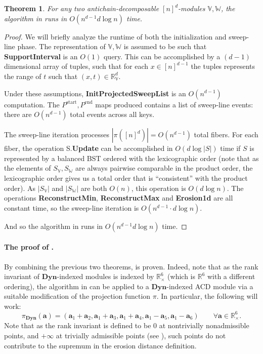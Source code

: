 \documentclass[a4paper,UKenglish,thm-restate]{article}
\newtheorem{theorem}{Theorem}[section]
\theoremstyle{definition}
\def\bbv{\mathbb{V}}
\def\bbw{\mathbb{W}}
\def\bdyn{\mathbf{Dyn}}
\begin{document}
            \begin{theorem}
                For any two antichain-decomposable $[n]^d$-modules $\bbv, \bbw$, the algorithm in  runs in $O(n^{d-1} d \log{n})$ time.
            \end{theorem}
            \begin{proof}
                We will briefly analyze the runtime of both the initialization and sweep-line phase. The representation of $\bbv, \bbw$ is assumed to be such that \textbf{SupportInterval} is an $O(1)$ query. This can be accomplished by a $(d-1)$ dimensional array of tuples, such that for each $x \in [n]^{d-1}$ the tuples represents the range of $t$ such that $(x, t) \in \mathbb{R}_{\bbv}^d$.
                
                Under these assumptions, \textbf{InitProjectedSweepList} is an $O(n^{d-1})$ computation. The $P^{\mathrm{start}}, P^{\mathrm{end}}$ maps produced contains a list of sweep-line events: there are $O(n^{d-1})$ total events across all keys. 

                The sweep-line iteration processes $|\pi([n]^d)| = O(n^{d-1})$ total fibers. For each fiber, the operation S.\textbf{Update} can be accomplished in $O(d \log{|S|})$ time if $S$ is represented by a balanced BST ordered with the lexicographic order (note that as the elements of $S_\bbv, S_\bbw$ are always pairwise comparable in the product order, the lexicographic order gives us a total order that is ``consistent'' with the product order). As $|S_\bbv|$ and $|S_\bbw|$ are both $O(n)$, this operation is $O(d \log{n})$. The operations \textbf{ReconstructMin}, \textbf{ReconstructMax} and \textbf{Erosion1d} are all constant time, so the sweep-line iteration is $O(n^{d-1} \cdot d \log{n})$.

                And so the algorithm in  runs in $O(n^{d-1} d \log{n})$ time.
            \end{proof}

           \paragraph{The proof of .} By combining the previous two theorems,  is proven. Indeed, note that as the rank invariant of $\bdyn$-indexed modules is indexed by $\mathbb{R}_{\times}^6$ (which is $\mathbb{R}^6$ with a different ordering), the algorithm in  can be applied to a $\bdyn$-indexed ACD module via a suitable modification of the projection function $\pi$. In particular, the following will work: \[ \pi_{\bdyn}(\mathbf{a}) = (\mathbf{a}_1 + \mathbf{a}_2, \mathbf{a}_1 + \mathbf{a}_3, \mathbf{a}_1 + \mathbf{a}_4, \mathbf{a}_1 - \mathbf{a}_5, \mathbf{a}_1 - \mathbf{a}_6) \qquad \forall \mathbf{a} \in \mathbb{R}_{\times}^6. \]
           Note that as the rank invariant is defined to be $0$ at nontrivially nonadmissible points, and $+\infty$ at trivially admissible points (see ), such points do not contribute to the supremum in the erosion distance definition.
\end{document}
